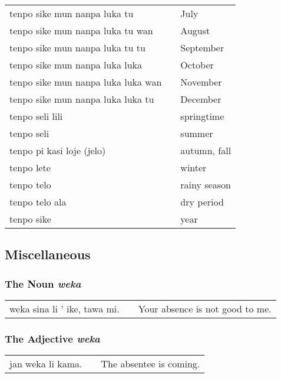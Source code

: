 \begin{supertabular}{p{5,5cm}|ll}
    tenpo sike mun nanpa luka tu           &  & July                      \\
    tenpo sike mun nanpa luka tu wan       &  & August                    \\
    tenpo sike mun nanpa luka tu tu        &  & September                 \\
    tenpo sike mun nanpa luka luka         &  & October                   \\
    tenpo sike mun nanpa luka luka wan     &  & November                  \\
    tenpo sike mun nanpa luka luka tu      &  & December                  \\
    tenpo seli lili                        &  & springtime                \\
    tenpo seli                             &  & summer                    \\
    tenpo pi kasi loje (jelo)              &  & autumn, fall              \\
    tenpo lete                             &  & winter                    \\
    tenpo telo                             &  & rainy season              \\
    tenpo telo ala                         &  & dry period                \\
    tenpo sike                             &  & year                      \\
\end{supertabular}

\subsection*{Miscellaneous}
\subsubsection*{The Noun \textit{weka}}

\begin{supertabular}{p{5,5cm}|ll}
    weka sina li ' ike, tawa mi. &  & Your absence is not good to me. \\
\end{supertabular}

\subsubsection*{The Adjective \textit{weka}}
\begin{supertabular}{p{5,5cm}|ll}
    jan weka li kama. &  & The absentee is coming. \\
\end{supertabular}

